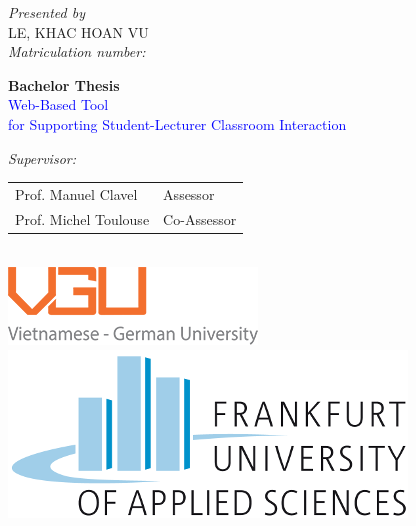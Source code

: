 \documentclass[a4paper, 11pt,openany]{book} %
\begin{document}
\begin{titlepage}
	{\em Presented by}\\
    \vspace{.1cm}
    {\Large LE, KHAC HOAN VU }\\
    {\em Matriculation number: }\\
	\vspace*{0.135\textheight} %
	
	
	\textbf{\LARGE Bachelor Thesis}\\[\baselineskip] %
	
	{\textcolor{Blue}{\HugeA Web-Based Tool }}\\
	{\textcolor{Blue}{\Huge for Supporting Student-Lecturer Classroom Interaction}}\\
	[\baselineskip] %
	
	{\Large \textit{
	    {\origdate 
	    }
	}} %
	
	\vfill %

    {\em Supervisor:}\\
    \begin{tabular}[]{l l}
      Prof. Manuel Clavel & Assessor\\
      Prof. Michel Toulouse & Co-Assessor\\
    \end{tabular}\\[\baselineskip]

	\includegraphics[scale=2]{vgu_logo} %
	\hspace{1cm}
	\includegraphics[scale=1]{images/Frankfurt-University-of-Applied-Sciences.png} %

	
	\vspace*{2\baselineskip} %

\end{titlepage}
\end{document}
